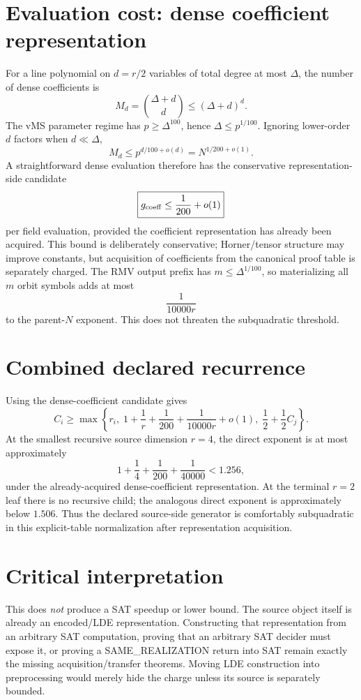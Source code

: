 \documentclass[11pt]{article}
\begin{document}
\section*{Evaluation cost: dense coefficient representation}
For a line polynomial on $d=r/2$ variables of total degree at most $\Delta$, the number of dense coefficients is
\[
M_d=\binom{\Delta+d}{d}\le (\Delta+d)^d.
\]
The vMS parameter regime has $p\ge\Delta^{100}$, hence $\Delta\le p^{1/100}$. Ignoring lower-order $d$ factors when $d\ll\Delta$,
\[
M_d\le p^{d/100+o(d)}
=N^{1/200+o(1)}.
\]
A straightforward dense evaluation therefore has the conservative representation-side candidate
\[
\boxed{g_{\rm coeff}\le\frac1{200}+o(1)}
\]
per field evaluation, provided the coefficient representation has already been acquired. This bound is deliberately conservative; Horner/tensor structure may improve constants, but acquisition of coefficients from the canonical proof table is separately charged.
The RMV output prefix has $m\le\Delta^{1/100}$, so materializing all $m$ orbit symbols adds at most
\[
\frac{1}{10000r}
\]
to the parent-$N$ exponent. This does not threaten the subquadratic threshold.
\section*{Combined declared recurrence}
Using the dense-coefficient candidate gives
\[
C_i\ge
\max\left\{
r_i,\;
1+\frac1r+\frac1{200}+\frac1{10000r}+o(1),\;
\frac12+\frac12C_j
\right\}.
\]
At the smallest recursive source dimension $r=4$, the direct exponent is at most approximately
\[
1+\frac14+\frac1{200}+\frac1{40000}<1.256,
\]
under the already-acquired dense-coefficient representation. At the terminal $r=2$ leaf there is no recursive child; the analogous direct exponent is approximately below $1.506$.
Thus the declared source-side generator is comfortably subquadratic in this explicit-table normalization after representation acquisition.
\section*{Critical interpretation}
This does \emph{not} produce a SAT speedup or lower bound. The source object itself is already an encoded/LDE representation. Constructing that representation from an arbitrary SAT computation, proving that an arbitrary SAT decider must expose it, or proving a SAME\_REALIZATION return into SAT remain exactly the missing acquisition/transfer theorems. Moving LDE construction into preprocessing would merely hide the charge unless its source is separately bounded.
\end{document}
